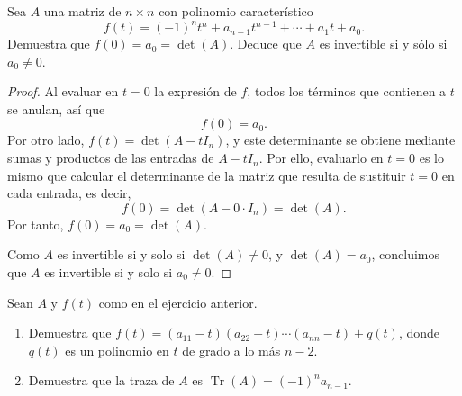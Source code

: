 \documentclass[12pt,a4paper]{article}
\renewcommand{\Tr}{\operatorname{Tr}}
\begin{document}
    \begin{problema}
        Sea $A$ una matriz de $n\times n$ con polinomio característico
        \begin{equation*}
            f(t)=(-1)^{n}t^{n}+a_{n-1}t^{n-1}+\cdots+a_{1}t+a_{0}.
        \end{equation*}
        Demuestra que $f(0)=a_{0}=\det(A)$. Deduce que $A$ es invertible si y sólo si $a_{0}\neq0$.
    \end{problema}

    \begin{proof}
        Al evaluar en $t=0$ la expresión de $f$, todos los términos que contienen a $t$ se anulan, así que
        \begin{equation*}
            f(0)=a_{0}.
        \end{equation*}
        Por otro lado, $f(t)=\det(A-tI_{n})$, y este determinante se obtiene mediante sumas y productos de las entradas de $A-tI_{n}$. Por ello, evaluarlo en $t=0$ es lo mismo que calcular el determinante de la matriz que resulta de sustituir $t=0$ en cada entrada, es decir,
        \begin{equation*}
            f(0)=\det(A-0\cdot I_{n})=\det(A).
        \end{equation*}
        Por tanto, $f(0)=a_{0}=\det(A)$.

        Como $A$ es invertible si y solo si $\det(A)\neq0$, y $\det(A)=a_{0}$, concluimos que $A$ es invertible si y solo si $a_{0}\neq0$.
    \end{proof}

    \begin{problema}
        Sean $A$ y $f(t)$ como en el ejercicio anterior.
        \begin{enumerate}[label=(\alph*)]
            \item Demuestra que $f(t)=(a_{11}-t)(a_{22}-t)\cdots(a_{nn}-t)+q(t)$, donde $q(t)$ es un polinomio en $t$ de grado a lo más $n-2$.
            \item Demuestra que la traza de $A$ es $\Tr(A)=(-1)^{n}a_{n-1}$.
        \end{enumerate}
    \end{problema}
\end{document}
